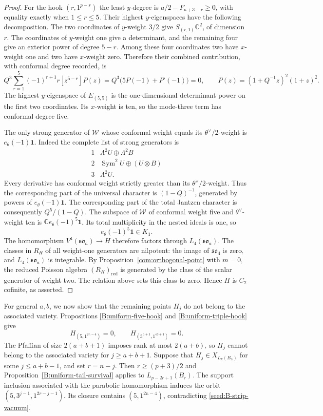 \documentclass[11pt,a4paper]{amsart}
\numberwithin{equation}{section}
\theoremstyle{definition}
\theoremstyle{remark}
\newcommand{\C}{\mathbb C}
\begin{document}
\begin{proof}
For the hook $(r,1^{p-r})$ the least $y$-degree is
$a/2-F_{a+3-r}\geq0$, with equality exactly when $1\leq r\leq5$.
Their highest $y$-eigenspaces have the following decomposition.
The two coordinates of $y$-weight $3/2$ give
$S_{(r,1)}\mathbb C^2$, of dimension $r$. The coordinates of
$y$-weight one give a determinant, and the remaining four give an
exterior power of degree $5-r$. Among these four coordinates two
have $x$-weight one and two have $x$-weight zero. Therefore their
combined contribution, with conformal degree recorded, is
$$
 Q^3\sum_{r=1}^{5}(-1)^{r+1}r[z^{5-r}]P(z)
 =Q^3\bigl(5P(-1)+P'(-1)\bigr)=0,
 \qquad P(z)=(1+Q^{-1}z)^2(1+z)^2.
$$
The highest $y$-eigenspace of $E_{(5,5)}$ is the one-dimensional
determinant power on the first two coordinates. Its $x$-weight is
ten, so the mode-three term has conformal degree five.

The only strong generator of $\mathcal W$ whose conformal weight
equals its $\theta^\vee/2$-weight is $e_\theta(-1)\mathbf1$.
Indeed the complete list of strong generators is
$$
 \begin{array}{c|c}
 1&\Lambda^2U\oplus\Lambda^2B\\
 2&\operatorname{Sym}^2U\oplus(U\otimes B)\\
 3&\Lambda^2U.
 \end{array}
$$
Every derivative has conformal weight strictly greater than its
$\theta^\vee/2$-weight. Thus the corresponding part of the universal character is
$(1-Q)^{-1}$, generated by powers of $e_\theta(-1)\mathbf1$.
The corresponding part of the total Jantzen character is consequently
$Q^5/(1-Q)$. The subspace of $\mathcal W$ of conformal weight five
and $\theta^\vee$-weight ten is
$\C e_\theta(-1)^5\mathbf1$. Its total multiplicity in the nested
ideals is one, so
$$
                  e_\theta(-1)^5\mathbf1\in K_1.
$$
The homomorphism $V^4(\mathfrak{so}_a)\to H$ therefore factors
through $L_4(\mathfrak{so}_a)$. The classes in $R_H$ of all weight-one
generators are nilpotent: the image of $\mathfrak{so}_4$ is zero,
and $L_4(\mathfrak{so}_a)$ is integrable. By Proposition~\ref{com:orthogonal-point} with $m=0$, the reduced
Poisson algebra $(R_H)_{\mathrm{red}}$ is generated by the class of the
scalar generator of weight two. The relation above sets this class to zero. Hence $H$ is $C_2$-cofinite, as asserted.
\end{proof}

\medskip
For general $a,b$, we now show that the remaining points $H_j$ do not belong to the associated variety.
Propositions
\ref{B:uniform-five-hook} and \ref{B:uniform-triple-hook} give
\begin{equation}\label{seed:B-strip-vacuum}
 H_{(5,1^{2n-4})}=0,\qquad H_{(3^{a+1},1^{4b+1})}=0.
\end{equation}
The Pfaffian of size $2(a+b+1)$ imposes rank at most $2(a+b)$,
so $H_j$ cannot belong to the associated variety for $j\geq a+b+1$.
Suppose that $H_j\in X_{L_k(B_n)}$ for some $j\leq a+b-1$, and set
$r=n-j$. Then
$r\geq(p+3)/2$ and Proposition~\ref{B:uniform-tail-survival} applies
to $L_{p-2r+1}(B_r)$. The support inclusion associated with the parabolic homomorphism induces the orbit
$(5,3^{j-1},1^{2r-j-1})$. Its closure contains
$(5,1^{2n-4})$, contradicting \eqref{seed:B-strip-vacuum}.
\end{document}
